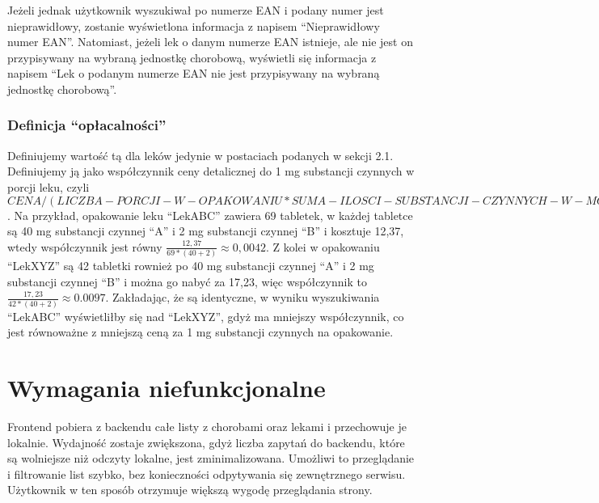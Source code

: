 \documentclass{article}
\begin{document}
        Jeżeli jednak użytkownik wyszukiwał po numerze EAN i podany numer jest nieprawidłowy, zostanie wyświetlona informacja z napisem ``Nieprawidłowy numer EAN''.
        Natomiast, jeżeli lek o danym numerze EAN istnieje, ale nie jest on przypisywany na wybraną jednostkę chorobową,
        wyświetli się informacja z napisem ``Lek o podanym numerze EAN nie jest przypisywany na wybraną jednostkę chorobową''.

      \subsubsection{Definicja ``opłacalności''}
        Definiujemy wartość tą dla leków jedynie w postaciach podanych w sekcji 2.1.
        Definiujemy ją jako współczynnik ceny detalicznej do 1 mg substancji czynnych w porcji leku,
        czyli $CENA / (LICZBA-PORCJI-W-OPAKOWANIU * SUMA-ILOSCI-SUBSTANCJI-CZYNNYCH-W-MG)$.
        Na przykład, opakowanie leku ``LekABC'' zawiera 69 tabletek, w każdej tabletce są 40 mg substancji czynnej ``A''
        i 2 mg substancji czynnej ``B'' i kosztuje 12,37,
        wtedy współczynnik jest równy $\frac{12,37}{69 * (40 + 2)} \approx 0,0042$.
        Z kolei w opakowaniu ``LekXYZ'' są 42 tabletki rownież po 40 mg substancji czynnej ``A'' i 2 mg substancji czynnej ``B'' i można go nabyć za 17,23,
        więc współczynnik to $\frac{17,23}{42 * (40 + 2)} \approx 0.0097$.
        Zakładając, że są identyczne, w wyniku wyszukiwania ``LekABC'' wyświetliłby się nad ``LekXYZ'', gdyż ma mniejszy współczynnik,
        co jest równoważne z mniejszą ceną za 1 mg substancji czynnych na opakowanie.

  \section{Wymagania niefunkcjonalne}
    Frontend pobiera z backendu całe listy z chorobami oraz lekami i przechowuje je lokalnie.
    Wydajność zostaje zwiększona, gdyż liczba zapytań do backendu, które są wolniejsze niż odczyty lokalne, jest zminimalizowana.
    Umożliwi to przeglądanie i filtrowanie list szybko, bez konieczności odpytywania się zewnętrznego serwisu.
    Użytkownik w ten sposób otrzymuje większą wygodę przeglądania strony.
\end{document}

